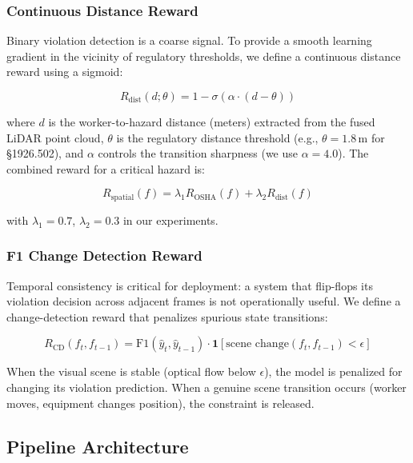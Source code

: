 \documentclass[sigconf,nonacm]{acmart}
\begin{document}
\subsubsection{Continuous Distance Reward}

Binary violation detection is a coarse signal.
To provide a smooth learning gradient in the vicinity of regulatory
thresholds, we define a continuous distance reward using a sigmoid:

\begin{equation}
  R_{\text{dist}}(d; \theta) =
    1 - \sigma\!\left(\alpha \cdot (d - \theta)\right)
  \label{eq:dist_reward}
\end{equation}

where $d$ is the worker-to-hazard distance (meters) extracted from the
fused LiDAR point cloud, $\theta$ is the regulatory distance threshold
(e.g., $\theta = 1.8$\,m for \S1926.502), and $\alpha$ controls the
transition sharpness (we use $\alpha = 4.0$).
The combined reward for a critical hazard is:

\begin{equation}
  R_{\text{spatial}}(f) =
    \lambda_1 R_{\text{OSHA}}(f) + \lambda_2 R_{\text{dist}}(f)
  \label{eq:combined}
\end{equation}

with $\lambda_1 = 0.7$, $\lambda_2 = 0.3$ in our experiments.

\subsubsection{F1 Change Detection Reward}

Temporal consistency is critical for deployment: a system that
flip-flops its violation decision across adjacent frames is not
operationally useful.
We define a change-detection reward that penalizes spurious state
transitions:

\begin{equation}
  R_{\text{CD}}(f_t, f_{t-1}) =
    \text{F1}\!\left(\hat{y}_t, \hat{y}_{t-1}\right)
    \cdot \mathbf{1}\!\left[\text{scene change}(f_t, f_{t-1}) < \epsilon\right]
  \label{eq:cd_reward}
\end{equation}

When the visual scene is stable (optical flow below $\epsilon$), the
model is penalized for changing its violation prediction.
When a genuine scene transition occurs (worker moves, equipment changes
position), the constraint is released.

\subsection{Pipeline Architecture}
\label{sec:pipeline}
\end{document}
